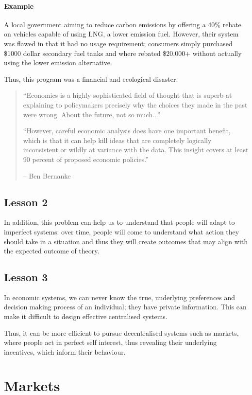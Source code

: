 \documentclass[12pt]{report}
\begin{document}
\subsubsection{Example}
A local government aiming to reduce carbon emissions by offering a 40\% rebate on vehicles capable 
of using LNG, a lower emission fuel. However, their system was flawed in that it had no usage requirement;
consumers simply purchased \$1000 dollar secondary fuel tanks and where rebated \$20,000+ without actually
using the lower emission alternative.
\par
Thus, this program was a financial and ecological disaster.

\begin{quotation}
``Economics is a highly sophisticated field of thought that is superb at explaining to policymakers precisely 
why the choices they made in the past were wrong. About the future, not so much...''
\par
``However, careful economic analysis does have one important benefit, which is that it can help kill ideas that are completely
logically inconsistent or wildly at variance with the data. This insight covers at least 90 percent of proposed economic policies.''
\par
-- Ben Bernanke
\end{quotation}

\section*{Lesson 2}
In addition, this problem can help us to understand that people will adapt to imperfect systems:
over time, people will come to understand what action they should take in a situation and thus they
will create outcomes that may align with the expected outcome of theory.

\section*{Lesson 3}
In economic systems, we can never know the true, underlying preferences and decision 
making process of an individual; they have private information. This can make it difficult
to design effective centralised systems.
\par
Thus, it can be more efficient to pursue decentralised systems such as markets,
where people act in perfect self interest, thus revealing their underlying incentives, which 
inform their behaviour.

\chapter*{Markets}
\end{document}
